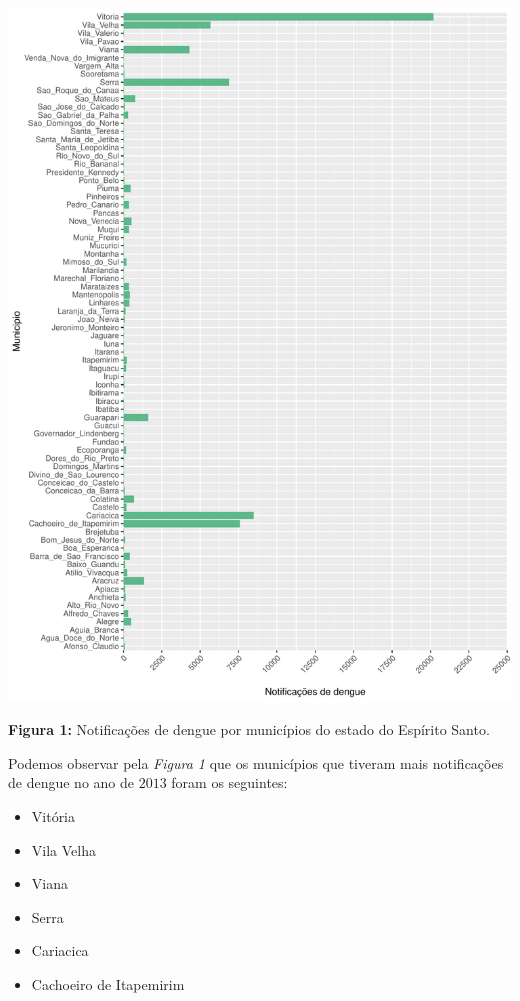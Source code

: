 \documentclass[12pt,a4paper]{article}\usepackage[]{graphicx}\usepackage[]{color}
\makeatletter
\def\maxwidth{ %
  \ifdim\Gin@nat@width>\linewidth
    \linewidth
  \else
    \Gin@nat@width
  \fi
}
\newenvironment{knitrout}{}{} %
\makeatother
\begin{document}

\begin{knitrout}
\color{fgcolor}

{\centering \includegraphics[width=\maxwidth]{figure/unnamed-chunk-3-1} 

}



\end{knitrout}
\textbf{Figura 1:} Notificações de dengue por municípios do estado do Espírito Santo.

\newpage
Podemos observar pela \emph{Figura 1} que os municípios que tiveram mais notificações de dengue no ano de $2013$ foram os seguintes:

\begin{itemize}
  \item Vitória
  \item Vila Velha
  \item Viana
  \item Serra
  \item Cariacica
  \item Cachoeiro de Itapemirim
\end{itemize}
\end{document}
